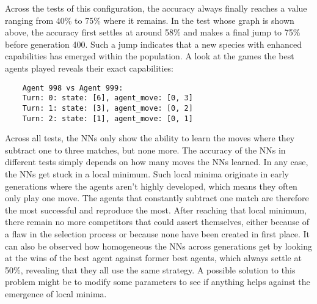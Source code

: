 Across the tests of this configuration, the accuracy always finally reaches a value ranging from 40\% to 75\% where it remains.
In the test whose graph is shown above, the accuracy first settles at around 58\% and makes a final jump to 75\% before generation 400.
Such a jump indicates that a new species with enhanced capabilities has emerged within the population.
A look at the games the best agents played reveals their exact capabilities:
\begin{verbatim}
    Agent 998 vs Agent 999:
    Turn: 0: state: [6], agent_move: [0, 3]
    Turn: 1: state: [3], agent_move: [0, 2]
    Turn: 2: state: [1], agent_move: [0, 1]
\end{verbatim}
Across all tests, the NNs only show the ability to learn the moves where they subtract one to three matches, but none more.
The accuracy of the NNs in different tests simply depends on how many moves the NNs learned.
In any case, the NNs get stuck in a local minimum.
Such local minima originate in early generations where the agents aren't highly developed, which means they often only play one move.
The agents that constantly subtract one match are therefore the most successful and reproduce the most.
After reaching that local minimum, there remain no more competitors that could assert themselves, either because of a flaw in the selection process or because none have been created in first place.
It can also be observed how homogeneous the NNs across generations get by looking at the wins of the best agent against former best agents, which always settle at 50\%, revealing that they all use the same strategy.
A possible solution to this problem might be to modify some parameters to see if anything helps against the emergence of local minima.

